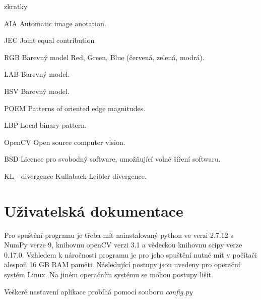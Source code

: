 \documentclass[czech,BP]{thesiskiv}
\begin{document}
\begin{labeling}{zkratky}
	\item [AIA] Automatic image anotation.	
	\item [JEC] Joint equal contribution
	\item [RGB] Barevný model Red, Green, Blue (červená, zelená, modrá).
	\item [LAB] Barevný model. 
	\item [HSV] Barevný model. 
	\item [POEM] Patterns of oriented edge magnitudes.
	\item [LBP] Local binary pattern.
	\item [OpenCV] Open source computer vision.
	\item [BSD] Licence pro svobodný software, umožňující volné šíření softwaru.
	\item [KL - divergence] Kullaback-Leibler divergence.
\end{labeling}


{\raggedright\small

}

\appendix
\chapter{Uživatelská dokumentace}
\par Pro spuštění programu je třeba mít nainstalovaný python ve verzi 2.7.12 s NumPy verze 9, knihovnu openCV verzi 3.1 a vědeckou knihovnu scipy verze 0.17.0. Vzhledem k náročnosti programu je pro jeho spuštění nutné mít v počítači alespoň 16 GB RAM paměti. Následující postupy jsou uvedeny pro operační systém Linux. Na jiném operačním systému se mohou postupy lišit.

\par Veškeré nastavení aplikace probíhá pomocí souboru \textit{config.py}
\end{document}
